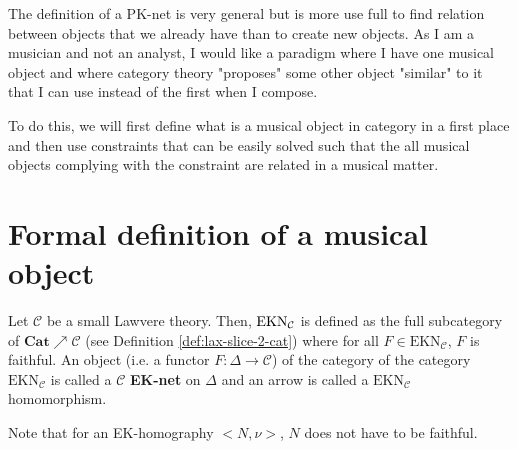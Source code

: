 
The definition of a PK-net is very general but is more use full to find relation between objects that we already have than to create new objects. As I am a musician and not an analyst, I would like a paradigm where I have one musical object and where category theory "proposes" some other object "similar" to it that I can use instead of the first when I compose.

To do this, we will first define what is a musical object in category in a first place and then use constraints that can be easily solved such that the all musical objects complying with the constraint are related in a musical matter.




\section{Formal definition of a musical object}


\begin{defn}[EK-nets]
    Let $\mathcal{C}$ be a small Lawvere theory. Then, $\bf \text{EKN}_\mathcal{C}$ \label{nomencl:EKN} is defined as the full subcategory of $\textbf{Cat}\nearrow \mathcal{C}$ (see Definition \ref{def:lax-slice-2-cat}) where for all $F\in \text{EKN}_\mathcal{C}$, $F$ is faithful. An object (i.e. a functor $F : \Delta \rightarrow \mathcal{C}$) of the category of the category $\text{EKN}_\mathcal{C}$ is called a $\mathcal{C}$ \textbf{EK-net} on  $\Delta$ and an arrow is called a $\text{EKN}_\mathcal{C}$ homomorphism.\end{defn}

\begin{rem}
    Note that for an EK-homography $\big<N,\nu\big>$, $N$ does not have to be faithful.
\end{rem}


